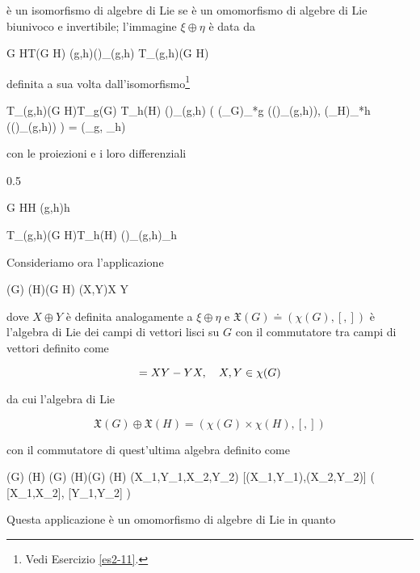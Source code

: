 è un isomorfismo di algebre di Lie se è un omomorfismo di algebre di Lie biunivoco e invertibile; l'immagine $ \xi \oplus \eta $ è data da

\map{\xi \oplus \eta}
	{G \times H}{T(G \times H)}
	{(g,h)}{(\xi \oplus \eta)_{(g,h)} \in T_{(g,h)}(G \times H)}

definita a sua volta dall'isomorfismo\footnote{%
	Vedi Esercizio \ref{es2-11}.%
}

	{T_{(g,h)}(G \times H)}{T_{g}(G) \times T_{h}(H)}
	{(\xi \oplus \eta)_{(g,h)}}
	{ %
		\left( (\pi_{G})_{*g} ((\xi \oplus \eta)_{(g,h)}), (\pi_{H})_{*h} ((\xi \oplus \eta)_{(g,h)}) \right) = (\xi_{g}, \eta_{h})
	}

con le proiezioni e i loro differenziali

	{0.5}{%
				{G \times H}{H}
				{(g,h)}{h}
				
				{T_{(g,h)}(G \times H)}{T_{h}(H)}
				{(\xi \oplus \eta)_{(g,h)}}{\eta_{h}}
			}

Consideriamo ora l'applicazione

\map{\phi}
	{(G) \oplus {}(H)}{(G \times H)}
	{(X,Y)}{X \oplus Y}

dove $ X \oplus Y $ è definita analogamente a $ \xi \oplus \eta $ e $ \mathfrak{X}(G) \doteq (\chi(G), [,]) $ è l'algebra di Lie dei campi di vettori lisci su $ G $ con il commutatore tra campi di vettori definito come

\begin{equation}
	[X,Y] = X Y - Y X \qcomma X, Y \in \chi(G)
\end{equation}

da cui l'algebra di Lie

\begin{equation}
	\mathfrak{X}(G) \oplus \mathfrak{X}(H) = (\chi(G) \times \chi(H),[,])
\end{equation}

con il commutatore di quest'ultima algebra definito come

\map{[,]}
	{\chi(G) \times \chi(H) \times \chi(G) \times \chi(H)}{\chi(G) \times \chi(H)}
	{(X_{1},Y_{1},X_{2},Y_{2})}
	{[(X_{1},Y_{1}),(X_{2},Y_{2})] \doteq \left( [X_{1},X_{2}], [Y_{1},Y_{2}] \right)}

Questa applicazione è un omomorfismo di algebre di Lie in quanto

